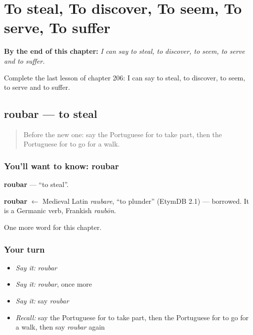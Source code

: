 
\chapter{To steal, To discover, To seem, To serve, To suffer}
\label{ch:pt-to-steal-to-discover-to-seem-to-serve-to-suffer}

\begin{chapteropening}
\textbf{By the end of this chapter:} \emph{I can say to steal, to discover, to seem, to serve and to suffer.}

Complete the last lesson of chapter 206: I can say to steal, to discover, to seem, to serve and to suffer.
\end{chapteropening}

\section[roubar]{roubar — to steal}

\label{lesson:PT-C206-roubar}



\begin{quote}
Before the new one: say the Portuguese for to take part, then the Portuguese for to go for a walk.
\end{quote}

\subsection*{You'll want to know: roubar}
\textbf{roubar} — \textquotedblleft{}to steal\textquotedblright{}.

\begin{cousinweb}
\textbf{roubar} $\leftarrow$ Medieval Latin \emph{raubare}, \textquotedblleft{}to plunder\textquotedblright{} (EtymDB 2.1) — borrowed. It is a Germanic verb, Frankish \emph{raubōn}.
\end{cousinweb}

\begin{grammarlens}[title={What you've built}]
One more word for this chapter.
\end{grammarlens}

\subsection*{Your turn}
\begin{itemize}
\raggedright
  \item \emph{Say it:} \emph{roubar}
  \item \emph{Say it:} \emph{roubar}, once more
  \item \emph{Say it:} say \emph{roubar}
  \item \emph{Recall:} say the Portuguese for to take part, then the Portuguese for to go for a walk, then say \emph{roubar} again
\end{itemize}

